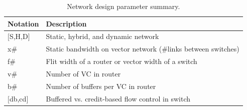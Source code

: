 \begin{table}
\footnotesize
\begin{tabular*}{\columnwidth}{p{1cm} p{7cm}}
  \bottomrule
  \textbf{Notation} & \textbf{Description} \\\midrule
  $[$S,H,D$]$ & Static, hybrid, and dynamic network \\\midrule
  x\# & Static bandwidth on vector network (\#links between switches) \\\midrule
  f\# & Flit width of a router or vector width of a switch \\\midrule
  v\# & Number of VC in router \\\midrule
  b\# & Number of buffers per VC in router \\\midrule
  $[$db,cd$]$ & Buffered vs. credit-based flow control in switch \\\midrule
\end{tabular*}
\caption{Network design parameter summary.}
\label{tab:notation}
\end{table}

